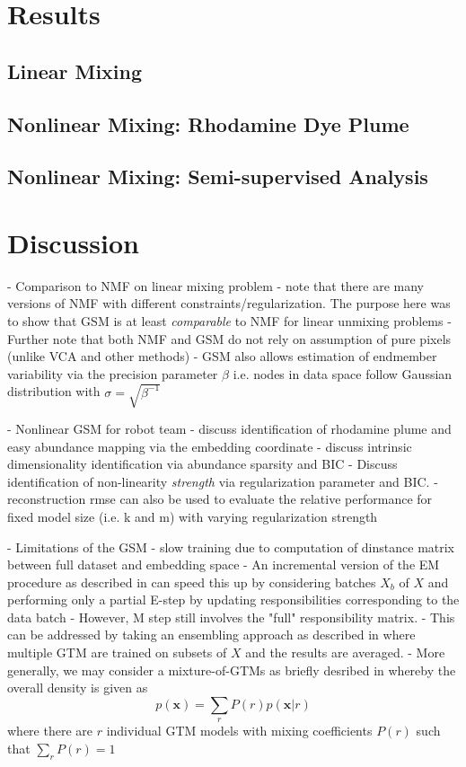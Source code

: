 \documentclass[remotesensing,article,submit,pdftex,moreauthors]{Definitions/mdpi}
\begin{document}
\section{Results}
\subsection{Linear Mixing}
\subsection{Nonlinear Mixing: Rhodamine Dye Plume}
\subsection{Nonlinear Mixing: Semi-supervised Analysis}


\section{Discussion}

- Comparison to NMF on linear mixing problem
    - note that there are many versions of NMF with different constraints/regularization. The purpose here was to show that GSM is at least \textit{comparable} to NMF for linear unmixing problems
    - Further note that both NMF and GSM do not rely on assumption of pure pixels (unlike VCA and other methods) 
    - GSM also allows estimation of endmember variability via the precision parameter $\beta$ i.e. nodes in data space follow Gaussian distribution with $\sigma = \sqrt{\beta^{-1}}$

- Nonlinear GSM for robot team 
    - discuss identification of rhodamine plume and easy abundance mapping via the embedding coordinate
    - discuss intrinsic dimensionality identification via abundance sparsity and BIC
    - Discuss identification of non-linearity \textit{strength} via regularization parameter and BIC.
    - reconstruction rmse can also be used to evaluate the relative performance for fixed model size (i.e. k and m) with varying regularization strength

- Limitations of the GSM
    - slow training due to computation of dinstance matrix between full dataset and embedding space
    - An incremental version of the EM procedure as described in \cite{gtm-developments} can speed this up by considering batches $X_b$ of $X$ and performing only a partial E-step by updating responsibilities corresponding to the data batch
    - However, M step still involves the "full" responsibility matrix. 
    - This can be addressed by taking an ensembling approach as described in \cite{parallel-gtm} where multiple GTM are trained on subsets of $X$ and the results are averaged. 
    - More generally, we may consider a mixture-of-GTMs as briefly desribed in \cite{gtm-orig} whereby the overall density is given as 
    \begin{equation}
        p(\mathbf{x}) = \sum_r P(r)p(\mathbf{x}\vert r)
    \end{equation}
    where there are $r$ individual GTM models with mixing coefficients $P(r)$ such that $\sum_r P(r) =1$
\end{document}

